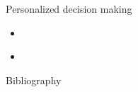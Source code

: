 \documentclass{beamer}
\begin{document}
\begin{frame}{Personalized decision making}
  \begin{itemize}
    \item \cite{mueller2023personalized} 
    \item \cite{tian2000probabilities} 
  \end{itemize}
\end{frame}


\begin{frame}[allowframebreaks]{Bibliography}
  \tiny

\end{frame}
\end{document}
